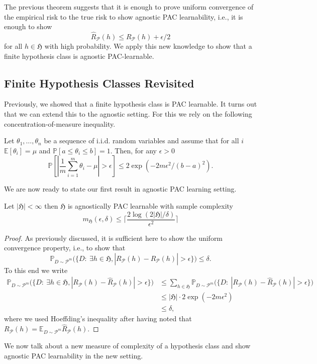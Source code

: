 The previous theorem suggests that it is enough to prove uniform convergence of
the empirical risk to the true risk to show agnostic PAC learnability, i.e., it
is enough to show
$$
\hat{R}_\mathcal{P}(h) \leq R_\mathcal{P}(h) + \epsilon/2
$$
for all $h \in \mathfrak{H}$ with high probability. 
We apply this new knowledge to show that a finite hypothesis class is
agnostic PAC-learnable.
\subsection{Finite Hypothesis Classes Revisited}
Previously, we showed that a finite hypothesis class is PAC learnable. It turns
out that we can extend this to the agnostic setting. For this we rely on the
following concentration-of-measure inequality. 
\begin{thm}
	Let $\theta_1, \dots, \theta_n$ be a sequence of i.i.d. random variables
	and assume that for all $i$ $\mathbb{E}[\theta_i] = \mu$ and
	$\mathbb{P}[a \leq \theta_i \leq b]=1$. Then, for any $\epsilon > 0$
	$$
	\mathbb{P}[|\frac{1}{m} \sum_{i=1}^{m} \theta_i - \mu| > \epsilon] \leq 2 \exp(-2m\epsilon^2/(b-a)^2).
	$$ 	
\end{thm}
We are now ready to state our first result in agnostic PAC learning setting.
	\begin{thm}
	Let $|\mathfrak{H}| < \infty$ then $\mathfrak{H}$ is agnostically PAC learnable with sample complexity
	$$m_{\mathfrak{H}}(\epsilon, \delta) \leq \lceil \frac{2 \log (2
	|\mathfrak{H}|/ \delta)}{\epsilon^2} \rceil$$
\end{thm}
\begin{proof}
As previously discussed, it is sufficient here to show the uniform convergence
property, i.e., to show that 
$$\mathbb{P}_{D \sim \mathcal{P}^m} \bigl( \{ D: \ \exists h \in \mathfrak{H},
|R_\mathcal{P}(h) - \hat{R}_\mathcal{P}(h)| > \epsilon \}\bigr) \leq
\delta.$$
To this end we write 
\begin{align*}
	\mathbb{P}_{D \sim \mathcal{P}^m} \bigl( \{ D: \ \exists h \in \mathfrak{H},
|R_\mathcal{P}(h) - \hat{R}_\mathcal{P}(h)| > \epsilon \}\bigr) &\leq \sum_{h \in \mathfrak{H}} \mathbb{P}_{D \sim \mathcal{P}^m} \bigl( \{ D: \ |R_\mathcal{P}(h) - \hat{R}_\mathcal{P}(h)| > \epsilon \}\bigr)\\
	&\leq |\mathfrak{H}| \cdot 2 \exp(-2m\epsilon^2) \\
	&\leq \delta,
\end{align*}
where we used Hoeffding's inequality after having noted that $R_\mathcal{P}(h) =  \mathbb{E}_{D \sim \mathcal{P}^m} \hat{R}_\mathcal{P}(h)$.
\end{proof}
We now talk about a new measure of complexity of a hypothesis class and show
agnostic PAC learnability in the new setting.
